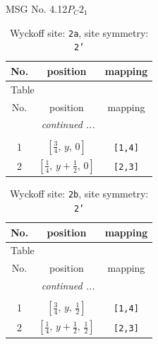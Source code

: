 \documentclass[fleqn,8pt]{jsarticle}
\begin{document}
\setcounter{MaxMatrixCols}{32}

\renewcommand{\tablename}{Table~}
\renewcommand{\figurename}{Figure~}
\begin{center}
\LARGE
MSG No. 4.12\quad$P_{C}2_{1}$
\end{center}
\renewcommand{\arraystretch}{1.2}
\begin{longtable}{ccc}
\caption{Wyckoff site: {\tt 2a}, site symmetry: {\tt 2'}}
 \\
 \hline \hline
No. & position & mapping \\ \hline \endfirsthead

\multicolumn{2}{l}{\tablename\ \thetable{}} \\
 \hline \hline
No. & position & mapping \\ \hline \endhead

 \hline \hline
\multicolumn{2}{r}{\footnotesize\it continued ...} \\ \endfoot

 \hline \hline
\multicolumn{2}{r}{} \\ \endlastfoot

1 & $\left[ \frac{3}{4},\, y,\, 0 \right]$ & {\tt [1,4]} \\ \hline
2 & $\left[ \frac{1}{4},\, y + \frac{1}{2},\, 0 \right]$ & {\tt [2,3]} \\
\end{longtable}
\renewcommand{\arraystretch}{1.2}
\begin{longtable}{ccc}
\caption{Wyckoff site: {\tt 2b}, site symmetry: {\tt 2'}}
 \\
 \hline \hline
No. & position & mapping \\ \hline \endfirsthead

\multicolumn{2}{l}{\tablename\ \thetable{}} \\
 \hline \hline
No. & position & mapping \\ \hline \endhead

 \hline \hline
\multicolumn{2}{r}{\footnotesize\it continued ...} \\ \endfoot

 \hline \hline
\multicolumn{2}{r}{} \\ \endlastfoot

1 & $\left[ \frac{3}{4},\, y,\, \frac{1}{2} \right]$ & {\tt [1,4]} \\ \hline
2 & $\left[ \frac{1}{4},\, y + \frac{1}{2},\, \frac{1}{2} \right]$ & {\tt [2,3]} \\
\end{longtable}
\end{document}

